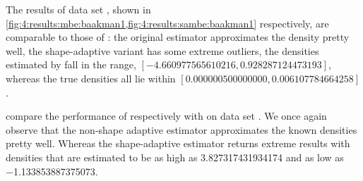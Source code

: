 	The results of data set \baakmanFour, shown in \cref{fig:4:results:mbe:baakman1,fig:4:results:sambe:baakman1} respectively, are comparable to those of \baakmanOne: the original estimator approximates the density pretty well, the shape-adaptive variant has some extreme outliers, the densities estimated by \sambe fall in the range, $\left[\num{-4.660977565610216}, \num{0.928287124473193}\right]$, whereas the true densities all lie within $\left[\num[scientific-notation=true]{0.000000500000000}, \num[scientific-notation=true]{0.006107784664258}\right]$.


	 compare the performance of respectively \mbe with \sambe on data set \baakmanFive. We once again observe that the non-shape adaptive estimator approximates the known densities pretty well. Whereas the shape-adaptive estimator returns extreme results with densities that are estimated to be as high as \num{3.827317431934174} and as low as \num{-1.133853887375073}.

